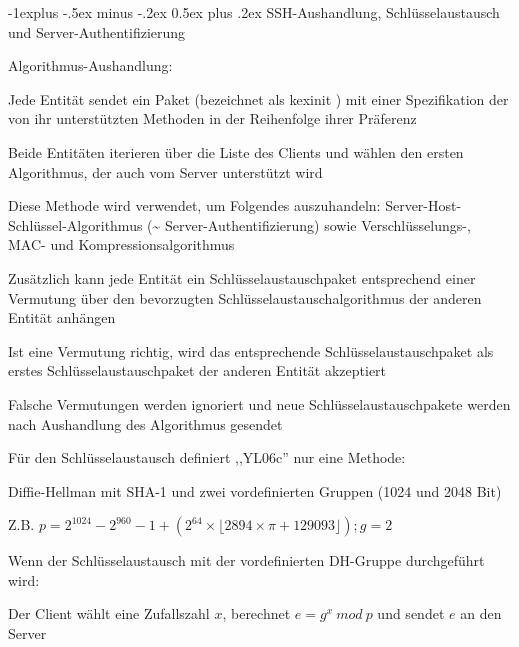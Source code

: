 \documentclass[a4paper]{article}
\makeatletter
\renewcommand{\subsection}{\@startsection{subsection}{2}{0mm}%
 {-1explus -.5ex minus -.2ex}%
 {0.5ex plus .2ex}%
 {\normalfont\normalsize\bfseries}}
\makeatother
\begin{document}
\begin{multicols}{3}
      \subsection{SSH-Aushandlung, Schlüsselaustausch und Server-Authentifizierung}
      \begin{itemize*}
            \item Algorithmus-Aushandlung:
            \begin{itemize*}
                  \item Jede Entität sendet ein Paket (bezeichnet als kexinit ) mit einer Spezifikation der von ihr unterstützten Methoden in der Reihenfolge ihrer Präferenz
                  \item Beide Entitäten iterieren über die Liste des Clients und wählen den ersten Algorithmus, der auch vom Server unterstützt wird
                  \item Diese Methode wird verwendet, um Folgendes auszuhandeln: Server-Host-Schlüssel-Algorithmus (\textasciitilde{} Server-Authentifizierung) sowie Verschlüsselungs-, MAC- und Kompressionsalgorithmus
                  \item Zusätzlich kann jede Entität ein Schlüsselaustauschpaket entsprechend einer Vermutung über den bevorzugten Schlüsselaustauschalgorithmus der anderen Entität anhängen
                  \item Ist eine Vermutung richtig, wird das entsprechende Schlüsselaustauschpaket als erstes Schlüsselaustauschpaket der anderen Entität akzeptiert
                  \item Falsche Vermutungen werden ignoriert und neue Schlüsselaustauschpakete werden nach Aushandlung des Algorithmus gesendet
            \end{itemize*}
            \item Für den Schlüsselaustausch definiert ,,YL06c'' nur eine Methode:
            \begin{itemize*}
                  \item Diffie-Hellman mit SHA-1 und zwei vordefinierten Gruppen (1024 und 2048 Bit)
                  \item Z.B. $p = 2^{1024} -2^{960} - 1 + (2^{64}\times \lfloor 2894 \times \pi + 129093\rfloor); g = 2$
            \end{itemize*}
            \item Wenn der Schlüsselaustausch mit der vordefinierten DH-Gruppe durchgeführt wird:
            \begin{itemize*}
                  \item Der Client wählt eine Zufallszahl $x$, berechnet $e=g^x\ mod\ p$ und sendet $e$ an den Server

\end{itemize*}
\end{itemize*}
\end{multicols}
\end{document}
